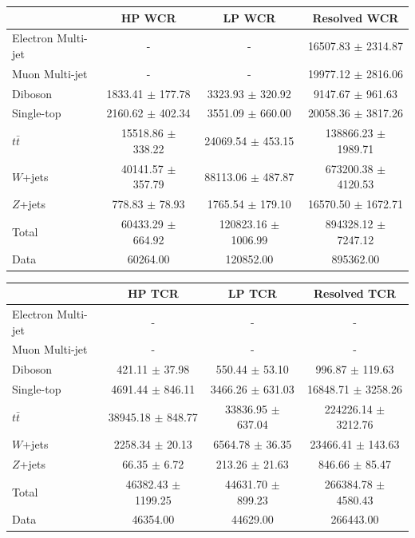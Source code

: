 \begin{table}
\begin{tabular}{|l|c|c|c|}
\hline
	  &	 HP WCR &	 LP WCR &	Resolved WCR \\\hline 
	Electron Multi-jet &	- &	- &	16507.83 $\pm$ 2314.87 \\\hline 
	Muon Multi-jet &	- &	- &	19977.12 $\pm$ 2816.06 \\\hline 
	Diboson &	1833.41 $\pm$ 177.78 &	3323.93 $\pm$ 320.92 &	9147.67 $\pm$ 961.63 \\\hline 
	Single-top &	2160.62 $\pm$ 402.34 &	3551.09 $\pm$ 660.00 &	20058.36 $\pm$ 3817.26 \\\hline 
	$t\bar{t}$ &	15518.86 $\pm$ 338.22 &	24069.54 $\pm$ 453.15 &	138866.23 $\pm$ 1989.71 \\\hline 
	$W$+jets &	40141.57 $\pm$ 357.79 &	88113.06 $\pm$ 487.87 &	673200.38 $\pm$ 4120.53 \\\hline 
	$Z$+jets &	778.83 $\pm$ 78.93 &	1765.54 $\pm$ 179.10 &	16570.50 $\pm$ 1672.71 \\\hline 
	Total &	60433.29 $\pm$ 664.92 &	120823.16 $\pm$ 1006.99 &	894328.12 $\pm$ 7247.12 \\\hline 
	Data &	60264.00 &	120852.00 &	895362.00 \\\hline 
\end{tabular}


 
\begin{tabular}{|l|c|c|c|}
\hline
	  &	 HP  TCR &	 LP  TCR &	Resolved TCR \\\hline 
	Electron Multi-jet &	- &	- &	- \\\hline 
	Muon Multi-jet &	- &	- &	- \\\hline 
	Diboson &	421.11 $\pm$ 37.98 &	550.44 $\pm$ 53.10 &	996.87 $\pm$ 119.63 \\\hline 
	Single-top &	4691.44 $\pm$ 846.11 &	3466.26 $\pm$ 631.03 &	16848.71 $\pm$ 3258.26 \\\hline 
	$t\bar{t}$ &	38945.18 $\pm$ 848.77 &	33836.95 $\pm$ 637.04 &	224226.14 $\pm$ 3212.76 \\\hline 
	$W$+jets &	2258.34 $\pm$ 20.13 &	6564.78 $\pm$ 36.35 &	23466.41 $\pm$ 143.63 \\\hline 
	$Z$+jets &	66.35 $\pm$ 6.72 &	213.26 $\pm$ 21.63 &	846.66 $\pm$ 85.47 \\\hline 
	Total &	46382.43 $\pm$ 1199.25 &	44631.70 $\pm$ 899.23 &	266384.78 $\pm$ 4580.43 \\\hline 
	Data &	46354.00 &	44629.00 &	266443.00 \\\hline 
\end{tabular}


\end{table}
